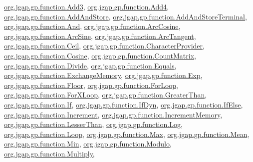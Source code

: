 \hyperlink{classorg_1_1jgap_1_1gp_1_1function_1_1_add3}{org.\-jgap.\-gp.\-function.\-Add3}, \hyperlink{classorg_1_1jgap_1_1gp_1_1function_1_1_add4}{org.\-jgap.\-gp.\-function.\-Add4}, \hyperlink{classorg_1_1jgap_1_1gp_1_1function_1_1_add_and_store}{org.\-jgap.\-gp.\-function.\-Add\-And\-Store}, \hyperlink{classorg_1_1jgap_1_1gp_1_1function_1_1_add_and_store_terminal}{org.\-jgap.\-gp.\-function.\-Add\-And\-Store\-Terminal}, \hyperlink{classorg_1_1jgap_1_1gp_1_1function_1_1_and}{org.\-jgap.\-gp.\-function.\-And}, \hyperlink{classorg_1_1jgap_1_1gp_1_1function_1_1_arc_cosine}{org.\-jgap.\-gp.\-function.\-Arc\-Cosine}, \hyperlink{classorg_1_1jgap_1_1gp_1_1function_1_1_arc_sine}{org.\-jgap.\-gp.\-function.\-Arc\-Sine}, \hyperlink{classorg_1_1jgap_1_1gp_1_1function_1_1_arc_tangent}{org.\-jgap.\-gp.\-function.\-Arc\-Tangent}, \hyperlink{classorg_1_1jgap_1_1gp_1_1function_1_1_ceil}{org.\-jgap.\-gp.\-function.\-Ceil}, \hyperlink{classorg_1_1jgap_1_1gp_1_1function_1_1_character_provider}{org.\-jgap.\-gp.\-function.\-Character\-Provider}, \hyperlink{classorg_1_1jgap_1_1gp_1_1function_1_1_cosine}{org.\-jgap.\-gp.\-function.\-Cosine}, \hyperlink{classorg_1_1jgap_1_1gp_1_1function_1_1_count_matrix}{org.\-jgap.\-gp.\-function.\-Count\-Matrix}, \hyperlink{classorg_1_1jgap_1_1gp_1_1function_1_1_divide}{org.\-jgap.\-gp.\-function.\-Divide}, \hyperlink{classorg_1_1jgap_1_1gp_1_1function_1_1_equals}{org.\-jgap.\-gp.\-function.\-Equals}, \hyperlink{classorg_1_1jgap_1_1gp_1_1function_1_1_exchange_memory}{org.\-jgap.\-gp.\-function.\-Exchange\-Memory}, \hyperlink{classorg_1_1jgap_1_1gp_1_1function_1_1_exp}{org.\-jgap.\-gp.\-function.\-Exp}, \hyperlink{classorg_1_1jgap_1_1gp_1_1function_1_1_floor}{org.\-jgap.\-gp.\-function.\-Floor}, \hyperlink{classorg_1_1jgap_1_1gp_1_1function_1_1_for_loop}{org.\-jgap.\-gp.\-function.\-For\-Loop}, \hyperlink{classorg_1_1jgap_1_1gp_1_1function_1_1_for_x_loop}{org.\-jgap.\-gp.\-function.\-For\-X\-Loop}, \hyperlink{classorg_1_1jgap_1_1gp_1_1function_1_1_greater_than}{org.\-jgap.\-gp.\-function.\-Greater\-Than}, \hyperlink{classorg_1_1jgap_1_1gp_1_1function_1_1_if}{org.\-jgap.\-gp.\-function.\-If}, \hyperlink{classorg_1_1jgap_1_1gp_1_1function_1_1_if_dyn}{org.\-jgap.\-gp.\-function.\-If\-Dyn}, \hyperlink{classorg_1_1jgap_1_1gp_1_1function_1_1_if_else}{org.\-jgap.\-gp.\-function.\-If\-Else}, \hyperlink{classorg_1_1jgap_1_1gp_1_1function_1_1_increment}{org.\-jgap.\-gp.\-function.\-Increment}, \hyperlink{classorg_1_1jgap_1_1gp_1_1function_1_1_increment_memory}{org.\-jgap.\-gp.\-function.\-Increment\-Memory}, \hyperlink{classorg_1_1jgap_1_1gp_1_1function_1_1_lesser_than}{org.\-jgap.\-gp.\-function.\-Lesser\-Than}, \hyperlink{classorg_1_1jgap_1_1gp_1_1function_1_1_log}{org.\-jgap.\-gp.\-function.\-Log}, \hyperlink{classorg_1_1jgap_1_1gp_1_1function_1_1_loop}{org.\-jgap.\-gp.\-function.\-Loop}, \hyperlink{classorg_1_1jgap_1_1gp_1_1function_1_1_max}{org.\-jgap.\-gp.\-function.\-Max}, \hyperlink{classorg_1_1jgap_1_1gp_1_1function_1_1_mean}{org.\-jgap.\-gp.\-function.\-Mean}, \hyperlink{classorg_1_1jgap_1_1gp_1_1function_1_1_min}{org.\-jgap.\-gp.\-function.\-Min}, \hyperlink{classorg_1_1jgap_1_1gp_1_1function_1_1_modulo}{org.\-jgap.\-gp.\-function.\-Modulo}, \hyperlink{classorg_1_1jgap_1_1gp_1_1function_1_1_multiply}{org.\-jgap.\-gp.\-function.\-Multiply}, 